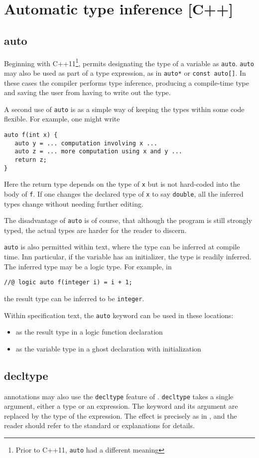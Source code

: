 \section{Automatic type inference [C++]}
\label{sec:auto}

\subsection{auto}
Beginning with C++11\footnote{Prior to C++11, \lstinline|auto| had a different meaning}, \lang permits designating the type of a variable as
\lstinline|auto|.
 \lstinline|auto| may also be used as part of a type expression, as in \lstinline|auto*| or \lstinline|const auto[]|. In these cases the compiler performs type inference, producing a compile-time type and
saving the user from having to write out the type.

A second use of \lstinline|auto| is as a simple way of keeping the types
within some code flexible. For example, one might write
\begin{lstlisting}
auto f(int x) {
   auto y = ... computation involving x ...
   auto z = ... more computation using x and y ...
   return z;
}
\end{lstlisting}
Here the return type depends on the type of \lstinline|x| but is not hard-coded into the body of \lstinline|f|. If one changes the declared type of
\lstinline|x| to say \lstinline|double|, all the inferred types change without needing further editing.

The disadvantage of \lstinline|auto| is of course, that although the 
program is still strongly typed, the actual types are harder for the reader to discern.

\lstinline|auto| is also permitted within \NAME text, where the type can be inferred at compile time.
Inn particular, if the variable has an initializer, the type is readily inferred.
 The inferred type may be a logic type. For example, in
\begin{lstlisting}
//@ logic auto f(integer i) = i + 1;
\end{lstlisting}
the result type can be inferred to be \lstinline|integer|.

Within \NAME specification text, the \lstinline|auto| keyword can be used in these locations:
\begin{itemize}
	\item as the result type in a logic function declaration
	\item as the variable type in a ghost declaration with initialization
\end{itemize}

\subsection{decltype}

\NAME annotations may also use the \lstinline|decltype| feature of \lang. \lstinline|decltype| takes a single argument, either a type or an expression. The keyword and its argument are
replaced by the type of the expression. The effect is precisely as in \lang, and the reader should refer to the \lang standard or explanations for details.


